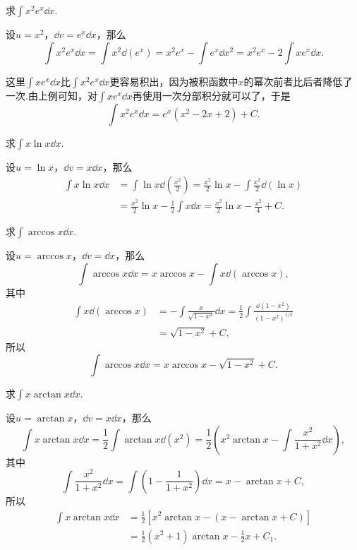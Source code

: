 \begin{example}
求\(\int x^2 e^x \dd{x}\).
\begin{solution}
设\(u = x^2\)，\(\dd{v} = e^x \dd{x}\)，那么\[
\int x^2 e^x \dd{x}
= \int x^2 \dd(e^x)
= x^2 e^x - \int e^x \dd{x^2}
= x^2 e^x - 2 \int x e^x \dd{x}.
\]

这里\(\int x e^x \dd{x}\)比\(\int x^2 e^x \dd{x}\)更容易积出，因为被积函数中\(x\)的幂次前者比后者降低了一次.由上例可知，对\(\int x e^x \dd{x}\)再使用一次分部积分就可以了，于是\[
\int x^2 e^x \dd{x} = e^x (x^2 -2x + 2) + C.
\]
\end{solution}
\end{example}

\begin{example}
求\(\int x \ln x \dd{x}\).
\begin{solution}
设\(u=\ln x\)，\(\dd{v} = x \dd{x}\)，那么\begin{align*}
\int x \ln x \dd{x}
&= \int \ln x \dd(\frac{x^2}{2})
= \frac{x^2}{2} \ln x - \int \frac{x^2}{2} \dd(\ln x) \\
&= \frac{x^2}{2} \ln x - \frac{1}{2} \int x \dd{x}
= \frac{x^2}{2} \ln x - \frac{x^2}{4} + C.
\end{align*}
\end{solution}
\end{example}

\begin{example}
求\(\int \arccos x \dd{x}\).
\begin{solution}
设\(u = \arccos x\)，\(\dd{v} = \dd{x}\)，那么\[
\int \arccos x \dd{x} = x \arccos x - \int x \dd(\arccos x),
\]其中\begin{align*}
\int x \dd(\arccos x)
&= -\int \frac{x}{\sqrt{1-x^2}} \dd{x}
= \frac{1}{2} \int \frac{\dd(1-x^2)}{(1-x^2)^{1/2}} \\
&= \sqrt{1-x^2} + C,
\end{align*}所以\[
\int \arccos x \dd{x} = x \arccos x - \sqrt{1-x^2} + C.
\]
\end{solution}
\end{example}

\begin{example}
求\(\int x \arctan x \dd{x}\).
\begin{solution}
设\(u = \arctan x\)，\(\dd{v} = x \dd{x}\)，那么\[
\int x \arctan x \dd{x}
= \frac{1}{2} \int \arctan x \dd(x^2)
= \frac{1}{2} \left( x^2 \arctan x
	- \int \frac{x^2}{1+x^2} \dd{x} \right),
\]其中\[
\int \frac{x^2}{1+x^2} \dd{x}
= \int \left(1-\frac{1}{1+x^2}\right) \dd{x}
= x - \arctan x + C,
\]所以\begin{align*}
\int x \arctan x \dd{x}
&= \frac{1}{2} \left[ x^2 \arctan x
	- (x - \arctan x + C) \right] \\
&= \frac{1}{2} (x^2+1) \arctan x - \frac{1}{2} x + C_1.
\end{align*}
\end{solution}
\end{example}

